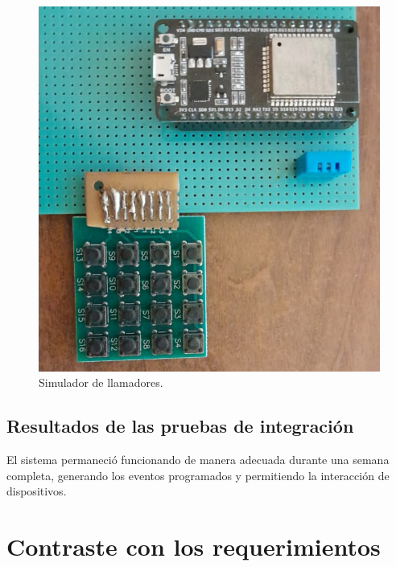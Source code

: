 \begin{figure}[ht]
	\centering
	\includegraphics[scale=.35]{./Figures/simulador.png}
	\caption{Simulador de llamadores.}
	\label{fig:Simulador de llamadores}
\end{figure}

\subsection{Resultados de las pruebas de integración}
\label{Resultados de las pruebas de integración}
El sistema permaneció funcionando de manera adecuada durante una semana completa, generando los eventos programados y permitiendo la interacción de dispositivos.

\pagebreak
\section{Contraste con los requerimientos}
\label{Contraste con los requerimientos}


